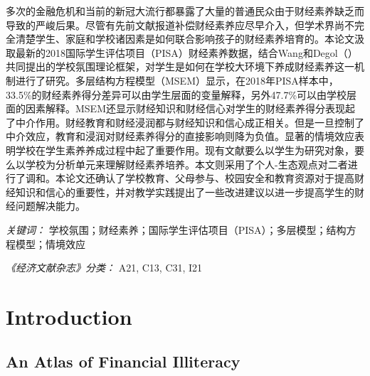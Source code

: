 \documentclass[a4paper,11pt,UKenglish,twoside,openright]{report}\usepackage[]{graphicx}\usepackage[]{color}
\begin{document}
\noindent 多次的金融危机和当前的新冠大流行都暴露了大量的普通民众由于财经素养缺乏而导致的严峻后果。尽管有先前文献报道补偿财经素养应尽早介入，但学术界尚不完全清楚学生、家庭和学校诸因素是如何联合影响孩子的财经素养培育的。本论文汲取最新的2018国际学生评估项目（PISA）财经素养数据，结合Wang和Degol（\citeyear{wang:2016}）共同提出的学校氛围理论框架，对学生是如何在学校大环境下养成财经素养这一机制进行了研究。多层结构方程模型（MSEM）显示，在2018年PISA样本中，33.5\%的财经素养得分差异可以由学生层面的变量解释，另外47.7\%可以由学校层面的因素解释。MSEM还显示财经知识和财经信心对学生的财经素养得分表现起了中介作用。财经教育和财经浸润都与财经知识和信心成正相关。但是一旦控制了中介效应，教育和浸润对财经素养得分的直接影响则降为负值。显著的情境效应表明学校在学生素养养成过程中起了重要作用。现有文献要么以学生为研究对象，要么以学校为分析单元来理解财经素养培养。本文则采用了个人-生态观点对二者进行了调和。本论文还确认了学校教育、父母参与、校园安全和教育资源对于提高财经知识和信心的重要性，并对教学实践提出了一些改进建议以进一步提高学生的财经问题解决能力。

\textit{关键词：} 学校氛围；财经素养；国际学生评估项目（PISA）；多层模型；结构方程模型；情境效应

\textit{《经济文献杂志》分类：} A21, C13, C31, I21
\setcounter{page}{10}

\clearpage
\thispagestyle{empty}

\setcounter{page}{0} %


\chapter{Introduction}
\label{chp:1}



\section{An Atlas of Financial Illiteracy}
\end{document}
